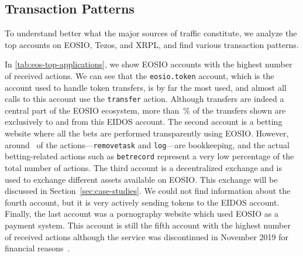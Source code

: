 


 



\subsection{Transaction Patterns}
To understand better what the major sources of traffic constitute, we analyze the top accounts on EOSIO, Tezos, and XRPL, and find various transaction patterns.

In \autoref{tab:eos-top-applications}, we show EOSIO accounts with the highest number of received actions.
We can see that the \texttt{eosio.token} account, which is the account used to handle  token transfers, is by far the most used, and almost all calls to this account use the \texttt{transfer} action.
Although  transfers are indeed a central part of the EOSIO ecosystem, more than~\% of the transfers shown are exclusively to and from this EIDOS account.
The second account is a betting website where all the bets are performed transparently using EOSIO.
However, around~ of the actions---\texttt{removetask} and \texttt{log}---are bookkeeping, and the actual betting-related actions such as \texttt{betrecord} represent a very low percentage of the total number of actions.
The third account is a decentralized exchange and is used to exchange different assets available on EOSIO. This exchange will be discussed in Section~\ref{sec:case-studies}.
We could not find information about the fourth account, but it is very actively sending  tokens to the EIDOS account.
Finally, the last account was a pornography website which used EOSIO as a payment system. This account is still the fifth account with the highest number of received actions although the service was discontinued in November 2019 for financial reasons~\cite{hashbaby-closing}.

